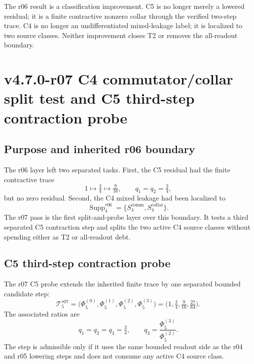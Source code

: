 \begin{remark}[r06 summary]
The r06 result is a classification improvement.  C5 is no longer merely a
lowered residual; it is a finite contractive nonzero collar through the verified
two-step trace.  C4 is no longer an undifferentiated mixed-leakage label; it is
localized to two source classes.  Neither improvement closes T2 or removes the
all-readout boundary.
\end{remark}



\clearpage
\section{v4.7.0-r07 C4 commutator/collar split test and C5 third-step contraction probe}
\label{sec:v470-r07-c4-split-c5-third-contraction}

\subsection{Purpose and inherited r06 boundary}
\label{subsec:v470-r07-purpose-inherited-r06-boundary}

The r06 layer left two separated tasks.  First, the C5 residual had the finite
contractive trace
\[
1\longmapsto \tfrac34\longmapsto \tfrac{9}{16},
\qquad q_1=q_2=\tfrac34,
\]
but no zero residual.  Second, the C4 mixed leakage had been localized to
\[
\operatorname{Supp}_{4}^{r06}
=
\{S_4^{\mathrm{comm}},S_4^{\mathrm{collar}}\}.
\]
The r07 pass is the first split-and-probe layer over this boundary.  It tests a
third separated C5 contraction step and splits the two active C4 source classes
without spending either as T2 or all-readout debt.

\subsection{C5 third-step contraction probe}
\label{subsec:v470-r07-c5-third-step-contraction-probe}

\begin{definition}
\label{def:v470-r07-third-step-c5-probe}
The r07 C5 probe extends the inherited finite trace by one separated bounded
candidate step:
\[
\mathcal T_{5}^{r07}
=
\bigl(\Phi_5^{(0)},\Phi_5^{(1)},\Phi_5^{(2)},\Phi_5^{(3)}\bigr)
=
\bigl(1,\tfrac34,\tfrac{9}{16},\tfrac{27}{64}\bigr).
\]
The associated ratios are
\[
q_1=q_2=q_3=\tfrac34,
\qquad
q_3=\frac{\Phi_5^{(3)}}{\Phi_5^{(2)}}.
\]
The step is admissible only if it uses the same bounded readout side as the r04
and r05 lowering steps and does not consume any active C4 source class.
\end{definition}

